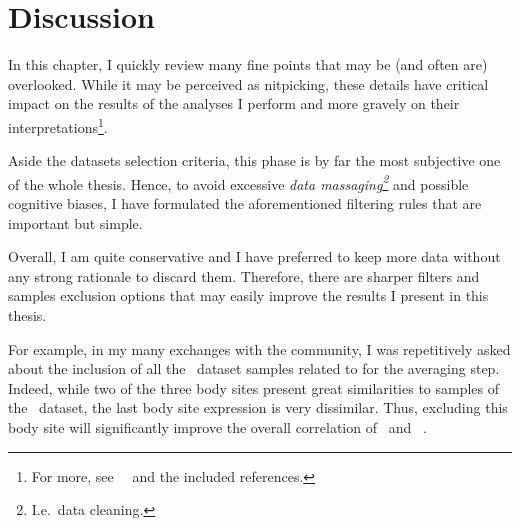 \section{Discussion}

In this chapter, I quickly review many fine points that
may be (and often are) overlooked.
While it may be perceived as nitpicking,
these details have critical impact on the results of the analyses
I perform and more gravely on their interpretations\footnote{%
For more, see~~
and the included references.}.

Aside the datasets selection criteria,
this phase is by far the most subjective one of the whole thesis.
Hence, to avoid excessive \emph{data massaging\footnote{I.e.\ data cleaning.}}
and possible cognitive biases,
I have formulated the aforementioned filtering rules
that are important but simple.

Overall, I am quite conservative and I have preferred to keep more data
without any strong rationale to discard them.
Therefore, there are sharper filters and samples exclusion options that
may easily improve the results I present in this thesis.

For example, in my many exchanges with the community,
I was repetitively asked about the inclusion of all the \gtex\ dataset samples
related to  for the averaging step.
Indeed, while two of the three body sites present great similarities
to  samples of the \uhlen\ dataset,
the last body site expression is very dissimilar.
Thus, excluding this body site will significantly improve
the overall correlation of \gtex\ and \uhlen\ .


